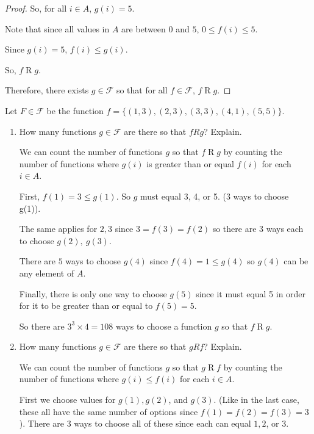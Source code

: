 \documentclass[]{article}
\begin{document}
\begin{enumerate}
\begin{enumerate}[label= (\alph*)]
\begin{proof}
            So, for all $i\in A$, $g(i)=5$.

            Note that since all values in $A$ are between $0$ and $5$, 
            $0\leq f(i)\leq 5$.

            Since $g(i)=5$, $f(i)\leq g(i)$.

            So, $f\mathrel{R}g$.

            Therefore, there exists $g\in\mathcal{F}$ so that for all $f\in\mathcal{F}$, $f\mathrel{R}g$.

        \end{proof}
        
        \end{enumerate}
        Let $F\in\mathcal{F}$ be the function $f=\{(1,3),(2,3),(3,3),(4,1),(5,5)\}$.
        \begin{enumerate}[resume*]
        \item How many functions $g\in\mathcal{F}$ are there so that $fRg$? Explain.
        
        We can count the number of functions $g$ so that $f\mathrel{R}g$ by counting
        the number of functions where $g(i)$ is greater than or equal $f(i)$ for each $i\in A$.

        First, $f(1)=3\leq g(1)$. So $g$ must equal 3, 4, or 5. (3 ways to choose
        g(1)).

        The same applies for $2,3$ since $3=f(3)=f(2)$ so there are 3 ways 
        each to choose $g(2), \: g(3)$.

        There are $5$ ways to choose $g(4)$ since $f(4)=1\leq g(4)$ so $g(4)$ can be 
        any element of $A$.

        Finally, there is only one way to choose $g(5)$ since it must equal 5
        in order for it to be greater than or equal to $f(5)=5$.

        So there are $3^3\times4=108$ ways to choose a function $g$ so that $f\mathrel{R}g$.



        \item How many functions $g\in\mathcal{F}$ are there so that $gRf$? Explain.

        We can count the number of functions $g$ so that $g\mathrel{R}f$ by counting
        the number of functions where $g(i)\leq f(i)$ for each $i\in A$.
        
        First we choose values for $g(1),g(2)$, and $g(3)$. (Like in the last
        case, these all have the same number of options since $f(1)=f(2)=f(3)=3$).
        There are 3 ways to choose all of these since each can equal $1,2$, or $3$.


\end{enumerate}
\end{enumerate}
\end{document}

